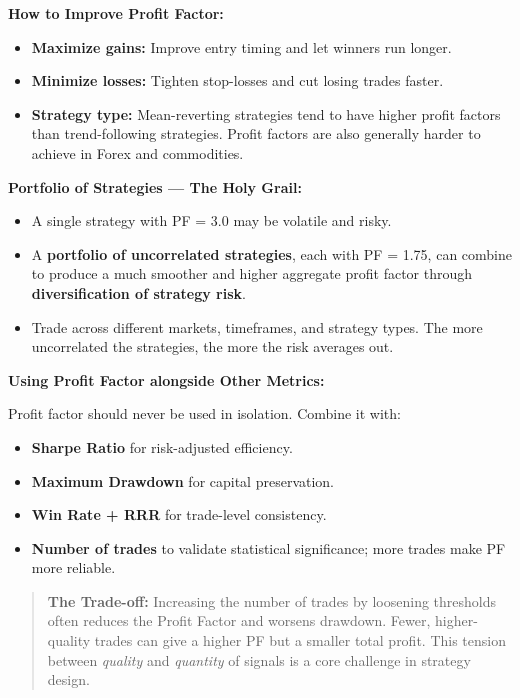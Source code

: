 \documentclass[12pt,openany]{book}
\begin{document}
\textbf{How to Improve Profit Factor:}
\begin{itemize}[leftmargin=*]
    \item \textbf{Maximize gains:} Improve entry timing and let winners run longer.
    \item \textbf{Minimize losses:} Tighten stop-losses and cut losing trades faster.
    \item \textbf{Strategy type:} Mean-reverting strategies tend to have higher profit factors than trend-following strategies. Profit factors are also generally harder to achieve in Forex and commodities.
\end{itemize}

\textbf{Portfolio of Strategies --- The Holy Grail:}
\begin{itemize}[leftmargin=*]
    \item A single strategy with PF = 3.0 may be volatile and risky.
    \item A \textbf{portfolio of uncorrelated strategies}, each with PF = 1.75, can combine to produce a much smoother and higher aggregate profit factor through \textbf{diversification of strategy risk}.
    \item Trade across different markets, timeframes, and strategy types. The more uncorrelated the strategies, the more the risk averages out.
\end{itemize}

\textbf{Using Profit Factor alongside Other Metrics:}

Profit factor should never be used in isolation. Combine it with:
\begin{itemize}[leftmargin=*]
    \item \textbf{Sharpe Ratio} for risk-adjusted efficiency.
    \item \textbf{Maximum Drawdown} for capital preservation.
    \item \textbf{Win Rate + RRR} for trade-level consistency.
    \item \textbf{Number of trades} to validate statistical significance; more trades make PF more reliable.
\end{itemize}

\begin{quote}
    \textbf{The Trade-off:} Increasing the number of trades by loosening thresholds often reduces the Profit Factor and worsens drawdown. Fewer, higher-quality trades can give a higher PF but a smaller total profit. This tension between \emph{quality} and \emph{quantity} of signals is a core challenge in strategy design.
\end{quote}
\end{document}
